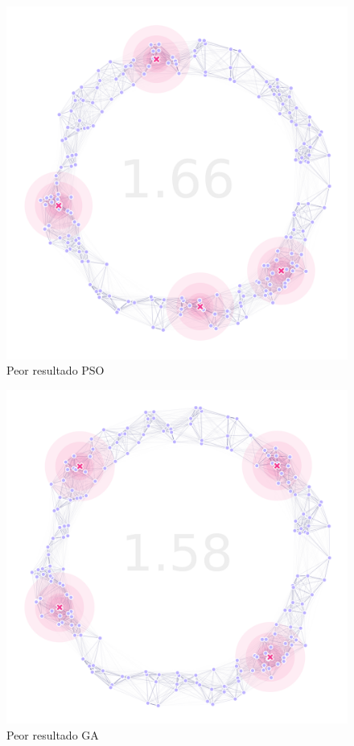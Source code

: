   \begin{figure}[ht!]
    \centering
    \includegraphics[width=\textwidth]{pso-worst.png}
    \caption{Peor resultado PSO}
    \label{fig:pso-worst}
  \end{figure}

  \begin{figure}[ht!]
    \centering
    \includegraphics[width=\textwidth]{ga-worst.png}
    \caption{Peor resultado GA}
    \label{fig:ga-worst}
  \end{figure}

